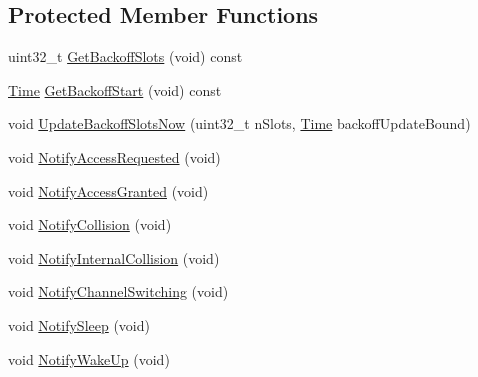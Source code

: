 \subsection*{Protected Member Functions}
\begin{DoxyCompactItemize}
\item 
uint32\+\_\+t \hyperlink{classns3_1_1DcfState_a8dcc74fcb8e2599d90eec9878db4015a}{Get\+Backoff\+Slots} (void) const 
\item 
\hyperlink{classns3_1_1Time}{Time} \hyperlink{classns3_1_1DcfState_a57002ba59096f30af64fc6d8d533c847}{Get\+Backoff\+Start} (void) const 
\item 
void \hyperlink{classns3_1_1DcfState_a29a5e7f09f98e5ac38d83d6341d71e1c}{Update\+Backoff\+Slots\+Now} (uint32\+\_\+t n\+Slots, \hyperlink{classns3_1_1Time}{Time} backoff\+Update\+Bound)
\item 
void \hyperlink{classns3_1_1DcfState_aed43f8911743ab0120fd262832879299}{Notify\+Access\+Requested} (void)
\item 
void \hyperlink{classns3_1_1DcfState_ab1e86215d2e81b51c769c687a782a92c}{Notify\+Access\+Granted} (void)
\item 
void \hyperlink{classns3_1_1DcfState_ab584f43178254676535f32bd93c52867}{Notify\+Collision} (void)
\item 
void \hyperlink{classns3_1_1DcfState_a984d94190f3f3b497f45ddcae512e16c}{Notify\+Internal\+Collision} (void)
\item 
void \hyperlink{classns3_1_1DcfState_a7a4bb5de2b56a66032e296c4c57e3ce8}{Notify\+Channel\+Switching} (void)
\item 
void \hyperlink{classns3_1_1DcfState_a0bee5c90edd0c49d6255a4bf0f011874}{Notify\+Sleep} (void)
\item 
void \hyperlink{classns3_1_1DcfState_ab2fbc7e8d3f37a30cca19135e443bc8a}{Notify\+Wake\+Up} (void)
\end{DoxyCompactItemize}
